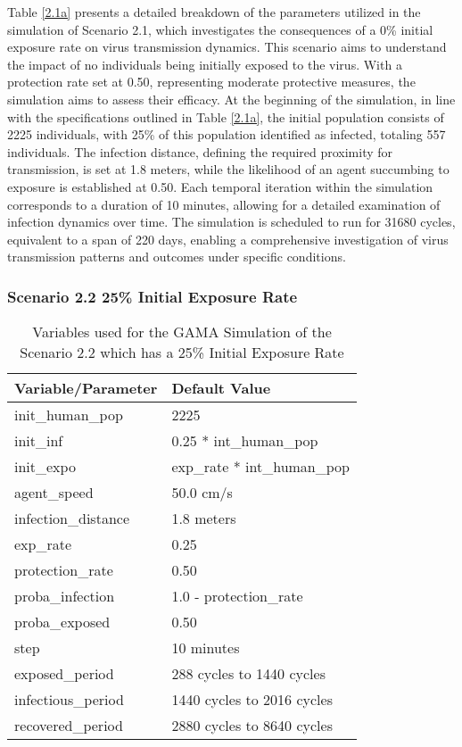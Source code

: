 Table \ref{2.1a} presents a detailed breakdown of the parameters utilized in the simulation of Scenario 2.1, which investigates the consequences of a 0\% initial exposure rate on virus transmission dynamics. This scenario aims to understand the impact of no individuals being initially exposed to the virus. With a protection rate set at 0.50, representing moderate protective measures, the simulation aims to assess their efficacy. At the beginning of the simulation, in line with the specifications outlined in Table \ref{2.1a}, the initial population consists of 2225 individuals, with 25\% of this population identified as infected, totaling 557 individuals. The infection distance, defining the required proximity for transmission, is set at 1.8 meters, while the likelihood of an agent succumbing to exposure is established at 0.50. Each temporal iteration within the simulation corresponds to a duration of 10 minutes, allowing for a detailed examination of infection dynamics over time. The simulation is scheduled to run for 31680 cycles, equivalent to a span of 220 days, enabling a comprehensive investigation of virus transmission patterns and outcomes under specific conditions.
	\subsubsection{Scenario 2.2 25\% Initial Exposure Rate}
	\begin{table}[H]
		\centering
		\begin{tabular}{ll}
			\toprule
			\textbf{Variable/}\textbf{Parameter} & \textbf{Default Value}\\
			\hline
			init\_human\_pop & 2225\\
			init\_inf & 0.25 * int\_human\_pop\\
			init\_expo & exp\_rate * int\_human\_pop \\
			agent\_speed & 50.0 cm/s\\
			infection\_distance & 1.8 meters\\
			exp\_rate & 0.25\\
			protection\_rate & 0.50\\
			proba\_infection & 1.0 - protection\_rate\\
			proba\_exposed & 0.50\\
			step & 10 minutes\\
			exposed\_period & 288 cycles to 1440 cycles\\
			infectious\_period & 1440 cycles to 2016 cycles\\
			recovered\_period & 2880 cycles to 8640 cycles\\ 
			\bottomrule
		\end{tabular}
		\caption{Variables used for the GAMA Simulation of the Scenario 2.2 which has a 25\% Initial Exposure Rate}
		\label{2.1b}
	\end{table}
	
